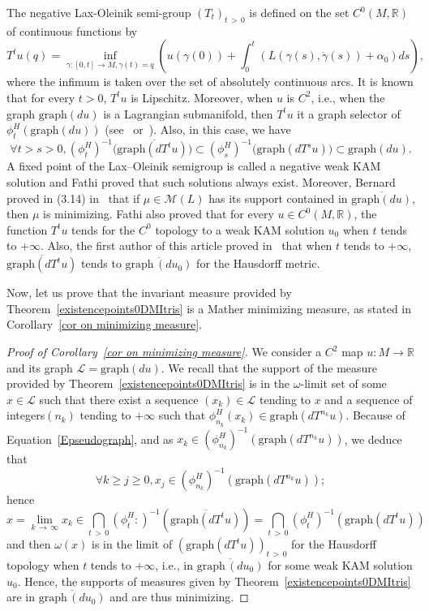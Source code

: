 \documentclass[AHL, Unicode, longabstracts, published]{cedram}
\newcommand*\M{\mathcal{M}}
\newcommand*\cl{\mathcal{L}}
\newcommand{\Graph}{\mathrm{graph}}
\newcommand*\R{\mathbb{R}}
\let\oldforall\forall
\renewcommand*{\forall}{\mathrel{\oldforall}}
\begin{document}
The negative Lax-Oleinik semi-group $(T_t)_{t\,>\,0}$ is defined on the set $C^0(M, \R)$ of continuous functions by
\[
T^tu(q)=\inf_{\gamma:[0, t]\to M, \gamma(t)=q} \left(u(\gamma(0))+\int_0^t(L(\gamma(s), \dot\gamma(s))+\alpha_0)ds\right),
\]
where the infimum is taken over the set of absolutely continuous arcs. It is known that for every $t>0$, $T^tu$ is Lipschitz. Moreover, when $u$ is $C^2$, i.e., when the graph $\Graph(du)$ is a Lagrangian submanifold, then $T^tu$ it a graph selector of $\phi^H_t(\Graph(du))$ (see~\cite{Jou91} or~\cite{Wei14}). Also, in this case, we have
\begin{equation}\label{Epseudograph}
\forall t>s>0, \left(\phi^H_t\right)^{-1}(\overline{\Graph(dT^tu))}\subset \left(\phi^H_s\right)^{-1}({\Graph(dT^su))}\subset \Graph(du).
\end{equation}
A fixed point of the Lax--Oleinik semigroup is called a negative weak KAM solution and Fathi proved that such solutions always exist. Moreover, Bernard proved in (3.14) in~\cite{Bernard08} that if $\mu\in \M(L)$ has its support contained in $\overline{\Graph(du)}$, then $\mu$ is minimizing.\newline
Fathi also proved that for every $u\in C^0(M, \R)$, the function $T^tu$ tends for the $C^0$ topology to a weak KAM solution $u_0$ when $t$ tends to $+\infty$. Also, the first author of this article proved in~\cite{Arnaud2005} that when $t$ tends to $+\infty$, $\overline{\Graph(dT^tu)}$ tends to $\overline{\Graph\,(du_0)}$ for the Hausdorff metric.



Now, let us prove that the invariant measure provided by Theorem~\ref{existencepoints0DMItris} is a Mather minimizing measure, as stated in Corollary~\ref{cor on minimizing measure}.


\begin{proof}[Proof of Corollary~\ref{cor on minimizing measure}]
We consider a $C^2$ map $u:M\to\R$ and its graph $\cl=\Graph(du)$. We recall that the support of the measure provided by Theorem~\ref{existencepoints0DMItris} is in the $\omega$-limit set of some $x\in\cl$ such that there exist a sequence $(x_k)\in \cl$ tending to $x$ and a sequence of integers$(n_k)$ tending to $+\infty$ such that $\phi^H_{n_k}(x_k)\in \Graph(dT^{n_k}u)$. Because of Equation~\ref{Epseudograph}, and as $x_k\in (\phi^H_{n_k})^{-1}(\Graph(dT^{n_k}u))$, we deduce that
\[
\forall k\geq j\geq 0, x_j\in \left(\phi^H_{n_k}\right)^{-1}\left(\Graph\left(dT^{n_k}u\right)\right);
\]
hence
\[
x=\lim_{k\,\to\,\infty} x_k\in \bigcap_{t\,>\,0}\left(\phi^H_t:\right)^{-1}\left(\overline{\Graph\left(dT^tu\right)}\right)=\bigcap_{t\,>\,0}\left(\phi^H_t\right)^{-1}\left(\Graph\left(dT^tu\right)\right)
\]
and then $\omega(x)$ is in the limit of $(\Graph(dT^tu))_{t\,>\,0}$ for the Hausdorff topology when $t$ tends to $+\infty$, i.e., in $\overline{\Graph\,(du_0)}$ for some weak KAM solution $u_0$. \newline
Hence, the supports of measures given by Theorem~\ref{existencepoints0DMItris} are in $\overline{\Graph\,(du_0)}$ and are thus minimizing.
\end{proof}
\end{document}
